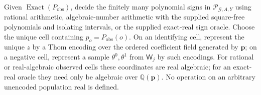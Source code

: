 Given \(\operatorname{Exact}(P_{\mathrm{obs}})\), decide the finitely many polynomial signs in \(\mathscr P_{\mathcal G,A,Y}\) using rational arithmetic, algebraic-number arithmetic with the supplied square-free polynomials and isolating intervals, or the supplied exact-real sign oracle. Choose the unique cell containing \(p_o=P_{\mathrm{obs}}(o)\). On an identifying cell, represent the unique \(z\) by a Thom encoding over the ordered coefficient field generated by \(\mathbf p\); on a negative cell, represent a sample \(\theta^0,\theta^1\) from \(\mathsf W_j\) by such encodings. For rational or real-algebraic observed cells these coordinates are real algebraic; for an exact-real oracle they need only be algebraic over \(\mathbb Q(\mathbf p)\). No operation on an arbitrary unencoded population real is defined.